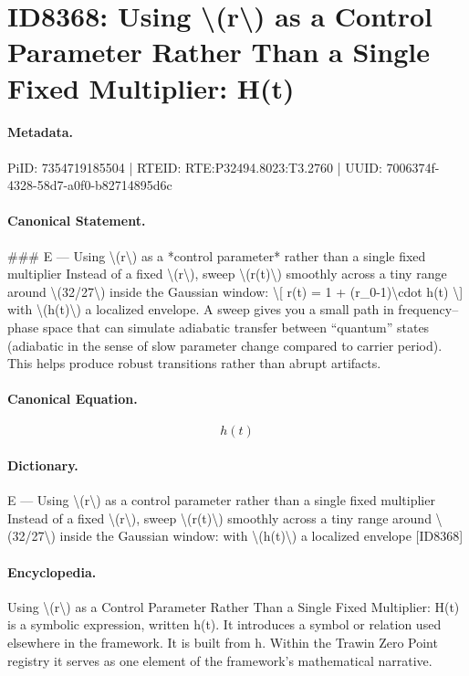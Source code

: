 \section*{ID8368: Using \textbackslash{}(r\textbackslash{}) as a Control Parameter Rather Than a Single Fixed Multiplier: H(t)}
\paragraph{Metadata.}
PiID: 7354719185504 | RTEID: RTE:P32494.8023:T3.2760 | UUID: 7006374f-4328-58d7-a0f0-b82714895d6c

\paragraph{Canonical Statement.}
\#\#\# E — Using \textbackslash{}(r\textbackslash{}) as a *control parameter* rather than a single fixed multiplier Instead of a fixed \textbackslash{}(r\textbackslash{}), sweep \textbackslash{}(r(t)\textbackslash{}) smoothly across a tiny range around \textbackslash{}(32/27\textbackslash{}) inside the Gaussian window: \textbackslash{}[ r(t) = 1 + (r\_0-1)\textbackslash{}cdot h(t) \textbackslash{}] with \textbackslash{}(h(t)\textbackslash{}) a localized envelope. A sweep gives you a small path in frequency–phase space that can simulate adiabatic transfer between “quantum” states (adiabatic in the sense of slow parameter change compared to carrier period). This helps produce robust transitions rather than abrupt artifacts.

\paragraph{Canonical Equation.}
\[
h(t)
\]

\paragraph{Dictionary.}
E — Using \textbackslash{}(r\textbackslash{}) as a control parameter rather than a single fixed multiplier Instead of a fixed \textbackslash{}(r\textbackslash{}), sweep \textbackslash{}(r(t)\textbackslash{}) smoothly across a tiny range around \textbackslash{}(32/27\textbackslash{}) inside the Gaussian window: with \textbackslash{}(h(t)\textbackslash{}) a localized envelope [ID8368]

\paragraph{Encyclopedia.}
Using \textbackslash{}(r\textbackslash{}) as a Control Parameter Rather Than a Single Fixed Multiplier: H(t) is a symbolic expression, written h(t). It introduces a symbol or relation used elsewhere in the framework. It is built from h. Within the Trawin Zero Point registry it serves as one element of the framework's mathematical narrative.
